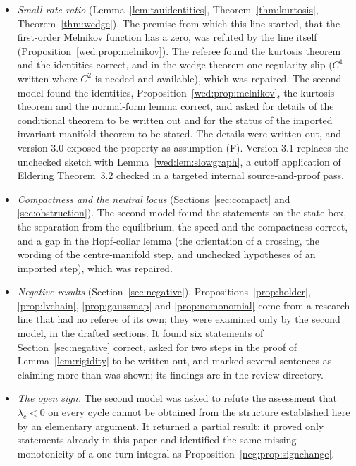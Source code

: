 \begin{itemize}
\item \emph{Small rate ratio} (Lemma~\ref{lem:tauidentities}, Theorem~\ref{thm:kurtosis}, Theorem~\ref{thm:wedge}). The premise from which this line started, that the first-order Melnikov function has a zero, was refuted by the line itself (Proposition~\ref{wed:prop:melnikov}). The referee found the kurtosis theorem and the identities correct, and in the wedge theorem one regularity slip ($C^1$ written where $C^2$ is needed and available), which was repaired. The second model found the identities, Proposition~\ref{wed:prop:melnikov}, the kurtosis theorem and the normal-form lemma correct, and asked for details of the conditional theorem to be written out and for the status of the imported invariant-manifold theorem to be stated. The details were written out, and version 3.0 exposed the property as assumption (F). Version 3.1 replaces the unchecked sketch with Lemma~\ref{wed:lem:slowgraph}, a cutoff application of Eldering Theorem~3.2 checked in a targeted internal source-and-proof pass.
\item \emph{Compactness and the neutral locus} (Sections~\ref{sec:compact} and \ref{sec:obstruction}). The second model found the statements on the state box, the separation from the equilibrium, the speed and the compactness correct, and a gap in the Hopf-collar lemma (the orientation of a crossing, the wording of the centre-manifold step, and unchecked hypotheses of an imported step), which was repaired.
\item \emph{Negative results} (Section~\ref{sec:negative}). Propositions~\ref{prop:holder}, \ref{prop:lvchain}, \ref{prop:gaussmap} and \ref{prop:nomonomial} come from a research line that had no referee of its own; they were examined only by the second model, in the drafted sections. It found six statements of Section~\ref{sec:negative} correct, asked for two steps in the proof of Lemma~\ref{lem:rigidity} to be written out, and marked several sentences as claiming more than was shown; its findings are in the review directory.
\item \emph{The open sign.} The second model was asked to refute the assessment that $\lambda_c<0$ on every cycle cannot be obtained from the structure established here by an elementary argument. It returned a partial result: it proved only statements already in this paper and identified the same missing monotonicity of a one-turn integral as Proposition~\ref{neg:prop:signchange}.
\end{itemize}
